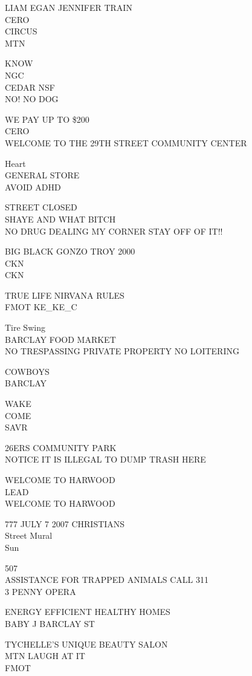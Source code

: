 \documentclass[10pt,letterpaper]{article}
\begin{document}
LIAM EGAN JENNIFER TRAIN\\
CERO\\
CIRCUS\\
MTN

KNOW\\
NGC\\
CEDAR NSF\\
NO! NO DOG

WE PAY UP TO \$200\\
CERO\\
WELCOME TO THE 29TH STREET COMMUNITY CENTER

Heart\\
GENERAL STORE\\
AVOID ADHD

STREET CLOSED\\
SHAYE AND WHAT BITCH\\
NO DRUG DEALING MY CORNER STAY OFF OF IT!!

BIG BLACK GONZO TROY 2000\\
CKN\\
CKN

TRUE LIFE NIRVANA RULES\\
FMOT KE\_KE\_C

Tire Swing\\
BARCLAY FOOD MARKET\\
NO TRESPASSING PRIVATE PROPERTY NO LOITERING

COWBOYS\\
BARCLAY

WAKE\\
COME\\
SAVR

26ERS COMMUNITY PARK\\
NOTICE IT IS ILLEGAL TO DUMP TRASH HERE

WELCOME TO HARWOOD\\
LEAD\\
WELCOME TO HARWOOD

777 JULY 7 2007 CHRISTIANS\\
Street Mural\\
Sun

507\\
ASSISTANCE FOR TRAPPED ANIMALS CALL 311\\
3 PENNY OPERA

ENERGY EFFICIENT HEALTHY HOMES\\
BABY J BARCLAY ST

TYCHELLE'S UNIQUE BEAUTY SALON\\
MTN LAUGH AT IT\\
FMOT
\end{document}
